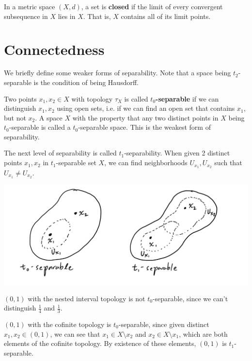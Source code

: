 \documentclass{article}
\begin{document}
  \begin{proposition}
  In a metric space $(X, d)$, a set is \textbf{closed} if the limit of every convergent subsequence in $X$ lies in $X$. That is, $X$ contains all of its limit points. 
  \end{proposition}

\section{Connectedness} 

    We briefly define some weaker forms of separability. Note that a space being $t_2$-separable is the condition of being Hausdorff. 

    \begin{definition}[$t_0, t_1$-Separability]
    Two points $x_1, x_2 \in X$ with topology $\tau_{X}$ is called $t_0$\textbf{-separable} if we can distinguish $x_1, x_2$ using open sets, i.e. if we can find an open set that contains $x_1$, but not $x_2$. A space $X$ with the property that any two distinct points in $X$ being $t_0$-separable is called a $t_0$-separable space. This is the weakest form of separability. 

    The next level of separability is called $t_1$-separability. When given 2 distinct points $x_1, x_2$ in $t_1$-separable set $X$, we can find neighborhoods $U_{x_1}, U_{x_2}$ such that $U_{x_1} \neq U_{x_2}$. 
    \begin{center}
        \includegraphics[scale=0.25]{img/t0_t1_Separability.PNG}
    \end{center}
    \end{definition}

    \begin{example}
    $(0,1)$ with the nested interval topology is not $t_0$-separable, since we can't distinguish $\frac{1}{4}$ and $\frac{1}{3}$.
    \end{example}

    \begin{example}
    $(0,1)$ with the cofinite topology is $t_0$-separable, since given distinct $x_1, x_2 \in (0,1)$, we can see that $x_1 \in X \setminus {x_2}$ and $x_2 \in X \setminus {x_1}$, which are both elements of the cofinite topology. By existence of these elements, $(0,1)$ is $t_1$-separable. 
    \end{example}
\end{document}
